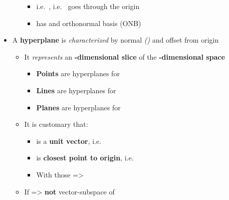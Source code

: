 \begin{itemize}
\begin{itemize}
    \begin{itemize}
    
    \item
      i.e.~, i.e.~ goes through the
      origin
    \item
       has  and orthonormal basis (ONB)
    \end{itemize}
  \end{itemize}
\item
  A \textbf{hyperplane}
  is \emph{characterized} by normal
  \emph{()} and offset from origin

  \begin{itemize}
  
  \item
    It \emph{represents} an \textbf{-dimensional slice} of
    the \textbf{-dimensional space}

    \begin{itemize}
    
    \item
      \textbf{Points} are hyperplanes for 
    \item
      \textbf{Lines} are hyperplanes for 
    \item
      \textbf{Planes} are hyperplanes for 
    \end{itemize}
  \item
    It is customary that:

    \begin{itemize}
    
    \item
       is a \textbf{unit vector},
      i.e.~
    \item
       is \textbf{closest point to origin},
      i.e.~
    \item
      With those =\textgreater{}
    \end{itemize}
  \item
    If 
    =\textgreater{}  \textbf{not} vector-subspace of


\end{itemize}
\end{itemize}
